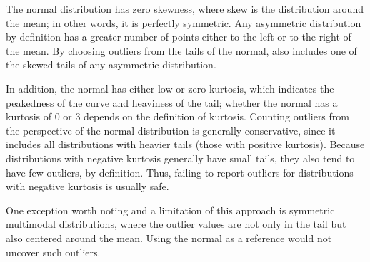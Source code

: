 The normal distribution has zero skewness, where skew is the
distribution around the mean; in other words, it is perfectly
symmetric. Any asymmetric distribution by definition has a greater
number of points either to the left or to the right of the mean. By
choosing outliers from the tails of the normal, \checkcell{} also
includes one of the skewed tails of any asymmetric distribution.

In addition, the normal has either low or zero kurtosis, which
indicates the peakedness of the curve and heaviness of the tail;
whether the normal has a kurtosis of 0 or 3 depends on the definition
of kurtosis. Counting outliers from the perspective of the normal
distribution is generally conservative, since it includes all
distributions with heavier tails (those with positive
kurtosis). Because distributions with negative kurtosis generally have
small tails, they also tend to have few outliers, by definition. Thus,
failing to report outliers for distributions with negative kurtosis is
usually safe.

One exception worth noting and a limitation of this approach is
symmetric multimodal distributions, where the outlier values are not only
in the tail but also centered around the mean. Using the normal as a
reference would not uncover such outliers.

